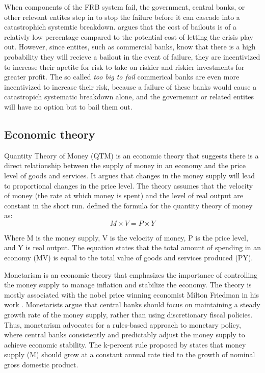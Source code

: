 When components of the FRB system fail, the government, central banks, or other relevant entites step in to stop the failure before it can cascade into a catastrophich systemtic breakdown. \textcite{berger2020tarp} argues that the cost of bailouts is of a relativly low percentage compared to the potential cost of letting the crisis play out. However, since entites, such as commercial banks, know that there is a high probability they will recieve a bailout in the event of failure, they are incentivized to increase their apetite for risk to take on riskier and riskier investments for greater profit. The so called \textit{too big to fail} commerical banks are even more incentivized to increase their risk, because a failure of these banks would cause a catastropich systematic breakdown alone, and the governemnt or related entites will have no option but to bail them out.

\subsection{Economic theory}
Quantity Theory of Money (QTM) is an economic theory that suggests there is a direct relationship between the supply of money in an economy and the price level of goods and services. It argues that changes in the money supply will lead to proportional changes in the price level. The theory assumes that the velocity of money (the rate at which money is spent) and the level of real output are constant in the short run. \textcite{fisherQTM} defined the formula for the quantity theory of money as:
\begin{equation}
    M \times V = P \times Y
\end{equation}

Where M is the money supply, V is the velocity of money, P is the price level, and Y is real output. The equation states that the total amount of spending in an economy (MV) is equal to the total value of goods and services produced (PY).

Monetarism is an economic theory that emphasizes the importance of controlling the money supply to manage inflation and stabilize the economy. The theory is mostly associated with the nobel price winning economist Milton Friedman in his work \textcite{friedman2008monetary}. Monetarists argue that central banks should focus on maintaining a steady growth rate of the money supply, rather than using discretionary fiscal policies. Thus, monetarism advocates for a rules-based approach to monetary policy, where central banks consistently and predictably adjust the money supply to achieve economic stability. The k-percent rule proposed by \textcite{friedman2008monetary} states that money supply (M) should grow at a constant annual rate tied to the growth of nominal gross domestic product. 

